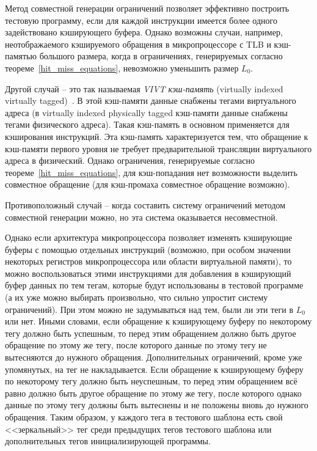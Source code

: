 Метод совместной генерации ограничений позволяет эффективно
построить тестовую программу, если для каждой инструкции имеется
более одного задействовано кэширующего буфера. Однако возможны
случаи, например, неотображаемого кэшируемого обращения в
микропроцессоре с TLB и кэш-памятью большого размера, когда в
ограничениях, генерируемых согласно
теореме~\ref{hit_miss_equations}, невозможно уменьшить размер $L_0$.

Другой случай -- это так называемая \emph{VIVT кэш-память}
(virtually indexed virtually tagged)~\cite{HennessyPatterson3rd}. В
этой кэш-памяти данные снабжены тегами виртуального адреса (в
virtually indexed physically tagged кэш-памяти данные снабжены
тегами физического адреса). Такая кэш-память в основном применяется
для кэширования инструкций. Эта кэш-память характеризуется тем, что
обращение к кэш-памяти первого уровня не требует предварительной
трансляции виртуального адреса в физический. Однако ограничения,
генерируемые согласно теореме~\ref{hit_miss_equations}, для
кэш-попадания нет возможности выделить совместное обращение (для
кэш-промаха совместное обращение возможно).

Противоположный случай -- когда составить систему ограничений
методом совместной генерации можно, но эта система оказывается
несовместной.

Однако если архитектура микропроцессора позволяет изменять
кэширующие буферы с помощью отдельных инструкций (возможно, при
особом значении некоторых регистров микропроцессора или области
виртуальной памяти), то можно воспользоваться этими инструкциями для
добавления в кэширующий буфер данных по тем тегам, которые будут
использованы в тестовой программе (а их уже можно выбирать
произвольно, что сильно упростит систему ограничений). При этом
можно не задумываться над тем, были ли эти теги в $L_0$ или нет.
Иными словами, если обращение к кэширующему буферу по некоторому
тегу должно быть успешным, то перед этим обращением должно быть
другое обращение по этому же тегу, после которого данные по этому
тегу не вытесняются до нужного обращения. Дополнительных
ограничений, кроме уже упомянутых, на тег не накладывается. Если
обращение к кэширующему буферу по некоторому тегу должно быть
неуспешным, то перед этим обращением всё равно должно быть другое
обращение по этому же тегу, после которого однако данные по этому
тегу должны быть вытеснены и не положены вновь до нужного обращения.
Таким образом, у каждого тега в тестового шаблона есть свой
<<зеркальный>> тег среди предыдущих тегов тестового шаблона или
дополнительных тегов инициализирующей программы.

